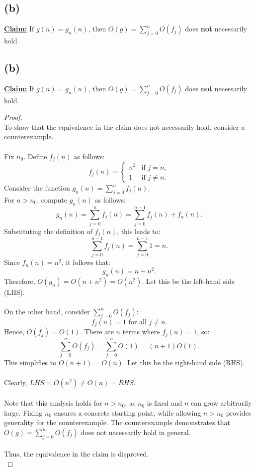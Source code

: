 \documentclass[12pt]{article}
\begin{document}
\subsection*{(b)}
\textbf{\underline{Claim:}} If \( g(n) = g_n(n) \), then \( O(g) = \sum_{j=0}^{n} O(f_j) \) does \textbf{not} necessarily hold.
\subsection*{(b)}
\textbf{\underline{Claim:}} If \( g(n) = g_n(n) \), then \( O(g) = \sum_{j=0}^{n} O(f_j) \) does \textbf{not} necessarily hold.
\begin{proof}
\leavevmode\\
    To show that the equivalence in the claim does not necessarily hold, consider a counterexample. \\
    \\
    Fix \( n_0 \). Define \( f_j(n) \) as follows:
    \[
    f_j(n) = \begin{cases} 
        n^2 & \text{if } j = n, \\
        1   & \text{if } j \neq n.
    \end{cases}
    \]
    Consider the function \( g_n(n) = \sum_{j=0}^n f_j(n) \).
    \\
    For \( n > n_0 \), compute \( g_n(n) \) as follows:
    \[
    g_n(n) = \sum_{j=0}^{n} f_j(n) = \sum_{j=0}^{n-1} f_j(n) + f_n(n).
    \]
    Substituting the definition of \( f_j(n) \), this leads to:
    \[
    \sum_{j=0}^{n-1} f_j(n) = \sum_{j=0}^{n-1} 1 = n.
    \]
    Since \( f_n(n) = n^2 \), it follows that:
    \[
    g_n(n) = n + n^2.
    \]
    Therefore, \( O(g_n) = O(n + n^2) = O(n^2) \). Let this be the left-hand side (LHS). \\
    \\
    On the other hand, consider \( \sum_{j=0}^n O(f_j) \):
    \[
    f_j(n) = 1 \text{ for all } j \neq n.
    \]
    Hence, \( O(f_j) = O(1) \). There are \( n \) terms where \( f_j(n) = 1 \), so:
    \[
    \sum_{j=0}^n O(f_j) = \sum_{j=0}^n O(1) = (n + 1) O(1).
    \]
    This simplifies to \( O(n + 1) = O(n) \). Let this be the right-hand side (RHS). \\
    \\
    Clearly, \( LHS = O(n^2) \neq O(n) = RHS \). \\
    \\
    Note that this analysis holds for \( n > n_0 \), as \( n_0 \) is fixed and \( n \) can grow arbitrarily large. Fixing \( n_0 \) ensures a concrete starting point, while allowing \( n > n_0 \) provides generality for the counterexample. The counterexample demonstrates that \( O(g) = \sum_{j=0}^{n} O(f_j) \) does not necessarily hold in general. \\
    \\
    Thus, the equivalence in the claim is disproved. \\
\end{proof}
\pagebreak
\end{document}
